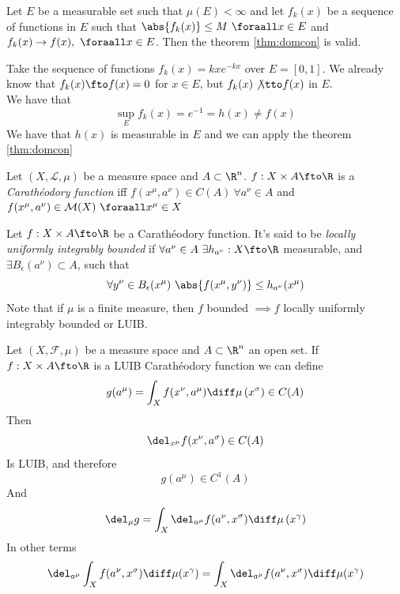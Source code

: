 \documentclass[../mmf.tex]{subfiles}
\begin{document}
\begin{cor}
	Let $E$ be a measurable set such that $\mu\left( E \right)<\infty$ and let $f_k(x)$ be a sequence of functions in $E$ such that $\abs{f_k(x)}\le M\ \foraall x\in E$ and $f_k(x)\to f(x),\ \foraall x\in E$. Then the theorem \eqref{thm:domcon} is valid.
\end{cor}
\begin{eg}
	Take the sequence of functions $f_k(x)=kxe^{-kx}$ over $E=[0,1]$. We already know that $f_k(x)\fto f(x)=0$ for $x\in E$, but $f_k(x)\not\tto f(x)$ in $E$.\\
	We have that
	\begin{equation*}
		\sup_Ef_k(x)=e^{-1}=h(x)\ne f(x)
	\end{equation*}
	We have that $h(x)$ is measurable in $E$ and we can apply the theorem \eqref{thm:domcon}
\end{eg}
\begin{dfn}
	Let $(X,\mathcal{L},\mu)$ be a measure space and $A\subset\R^n$. $f:X\times A\fto\R$ is a \textit{Carathéodory function} iff $f(x^\mu,a^\nu)\in C(A)\ \forall a^\nu\in A$ and $f(x^\mu,a^\nu)\in\mathcal{M}(X)\ \foraall x^\mu\in X$
\end{dfn}
\begin{dfn}
	Let $f:X\times A\fto\R$ be a Carathéodory function. It's said to be \textit{locally uniformly integrably bounded} if $\forall a^\nu\in A\ \exists h_{a^\nu}:X\fto\R$ measurable, and $\exists B_\epsilon(a^\nu)\subset A$, such that
	\begin{equation*}
		\forall y^\nu\in B_\epsilon(x^\mu)\ \abs{f(x^\mu,y^\nu)}\le h_{a^\nu}(x^\mu)
	\end{equation*}
	Note that if $\mu$ is a finite measure, then $f$ bounded $\implies{} f$ locally uniformly integrably bounded or LUIB.
\end{dfn}
\begin{thm}
	Let $(X,\mathcal{F},\mu)$ be a measure space and $A\subset\R^n$ an open set. If $f:X\times A\fto\R$ is a LUIB Carathéodory function we can define
	\begin{equation*}
		g(a^\mu)=\int_{X}^{}f(x^\nu,a^\mu)\diff\mu\left( x^\sigma \right)\in C(A)
	\end{equation*}
	Then
	\begin{equation*}
		\del_{x^\mu}f(x^\nu,a^\sigma)\in C(A)
	\end{equation*}
	Is LUIB, and therefore
	\begin{equation*}
		g(a^\mu)\in C^1(A)
	\end{equation*}
	And
	\begin{equation*}
		\del_\mu g=\int_{X}^{}\del_{a^\mu}f(a^\nu,x^\sigma)\diff\mu\left( x^\gamma \right)
	\end{equation*}
	In other terms
	\begin{equation}
		\del_{a^\mu}\int_{X}^{}f(a^\nu,x^\sigma)\diff\mu(x^\gamma)=\int_{X}^{}\del_{a^\mu}f(a^\nu,x^\sigma)\diff\mu(x^\gamma)
		\label{eq:leibnizrule}
	\end{equation}
\end{thm}
\end{document}
